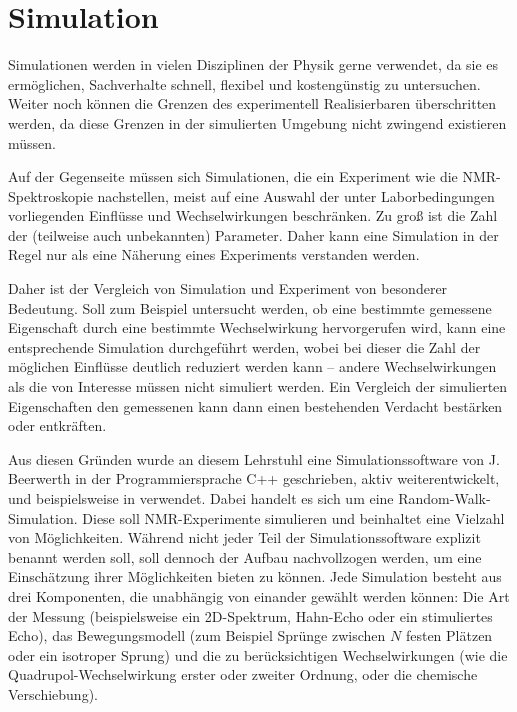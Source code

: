 \chapter{Simulation}\label{chapter:simulation}

Simulationen werden in vielen Disziplinen der Physik gerne verwendet, da sie es ermöglichen, Sachverhalte schnell, flexibel und kostengünstig zu untersuchen. Weiter noch können die Grenzen des experimentell Realisierbaren überschritten werden, da diese Grenzen in der simulierten Umgebung nicht zwingend existieren müssen.

Auf der Gegenseite müssen sich Simulationen, die ein Experiment wie die NMR-Spektroskopie nachstellen, meist auf eine Auswahl der unter Laborbedingungen vorliegenden Einflüsse und Wechselwirkungen beschränken. Zu groß ist die Zahl der (teilweise auch unbekannten) Parameter. Daher kann eine Simulation in der Regel nur als eine Näherung eines Experiments verstanden werden.

Daher ist der Vergleich von Simulation und Experiment von besonderer Bedeutung. Soll zum Beispiel untersucht werden, ob eine bestimmte gemessene Eigenschaft durch eine bestimmte Wechselwirkung hervorgerufen wird, kann eine entsprechende Simulation durchgeführt werden, wobei bei dieser die Zahl der möglichen Einflüsse deutlich reduziert werden kann -- andere Wechselwirkungen als die von Interesse müssen nicht simuliert werden. Ein Vergleich der simulierten Eigenschaften den gemessenen kann dann einen bestehenden Verdacht bestärken oder entkräften.


Aus diesen Gründen wurde an diesem Lehrstuhl eine Simulationssoftware von J. Beerwerth in der Programmiersprache C++ geschrieben, aktiv weiterentwickelt, und beispielsweise in \cite{joachim_master} verwendet. Dabei handelt es sich um eine Random-Walk-Simulation. Diese soll NMR-Experimente simulieren und beinhaltet eine Vielzahl von Möglichkeiten. Während nicht jeder Teil der Simulationssoftware explizit benannt werden soll, soll dennoch der Aufbau nachvollzogen werden, um eine Einschätzung ihrer Möglichkeiten bieten zu können. Jede Simulation besteht aus drei Komponenten, die unabhängig von einander gewählt werden können: Die Art der Messung (beispielsweise ein 2D-Spektrum, Hahn-Echo oder ein stimuliertes Echo), das Bewegungsmodell (zum Beispiel Sprünge zwischen $N$ festen Plätzen oder ein isotroper Sprung) und die zu berücksichtigen Wechselwirkungen (wie die Quadrupol-Wechselwirkung erster oder zweiter Ordnung, oder die chemische Verschiebung).

